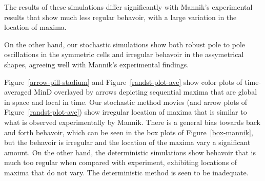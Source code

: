 \documentclass[letterpaper,twocolumn,amsmath,amssymb,pre]{revtex4-1}
\begin{document}
The results of these simulations differ significantly with Mannik's
experimental results that show much less regular behavoir, with a
large variation in the location of maxima.

On the other hand, our stochastic simulations show both robust pole to
pole oscillations in the symmetric cells and irregular behavoir in the
assymetrical shapes, agreeing well with Mannik's experimental
findings.

Figure~\ref{arrow-pill-stadium} and Figure~\ref{randst-plot-ave} show
color plots of time-averaged MinD overlayed by arrows depicting
sequential maxima that are global in space and local in time.  Our
stochastic method movies (and arrow plots of
Figure~\ref{randst-plot-ave}) show irregular location of maxima that
is similar to what is observed experimentally by Mannik. There is a
general bias towards back and forth behavoir, which can be seen in the
box plots of Figure~\ref{box-mannik}, but the behavoir is irregular
and the location of the maxima vary a significant amount.  On the
other hand, the deterministic simulations show behavoir that is much
too regular when compared with experiment, exhibiting locations of
maxima that do not vary.  The deterministic method is seen to be
inadequate.
\end{document}
